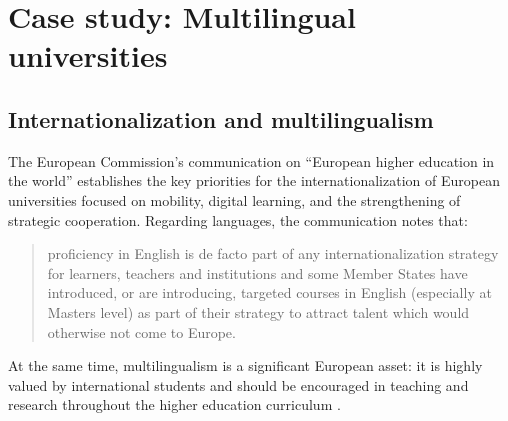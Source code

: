 \documentclass[output=paper]{langscibook}
\begin{document}
\section{Case study: Multilingual universities}
\subsection{Internationalization and multilingualism}

The European Commission’s communication on “European higher education in the world” establishes the key priorities for the internationalization of European universities focused on mobility, digital learning, and the strengthening of strategic cooperation. Regarding languages, the communication notes that:

\begin{quote}
proficiency in English is de facto part of any internationalization strategy for learners, teachers and institutions and some Member States have introduced, or are introducing, targeted courses in English (especially at Masters level) as part of their strategy to attract talent which would otherwise not come to Europe. \citep{EuropeanCommission2013}
\end{quote}
    
\begin{sloppypar}
At the same time, multilingualism is a significant European asset: it is highly valued by international students and should be encouraged in teaching and research throughout the higher education curriculum \citep{EuropeanCommission2013}.
\end{sloppypar}
\end{document}

